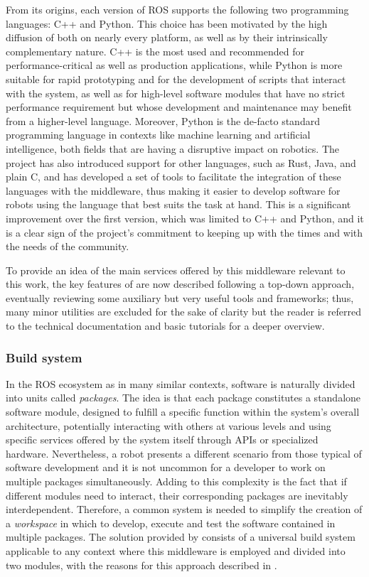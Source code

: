 From its origins, each version of ROS supports the following two programming languages: C++ and Python. This choice has been motivated by the high diffusion of both on nearly every platform, as well as by their intrinsically complementary nature. C++ is the most used and recommended for performance-critical as well as production applications, while Python is more suitable for rapid prototyping and for the development of scripts that interact with the system, as well as for high-level software modules that have no strict performance requirement but whose development and maintenance may benefit from a higher-level language. Moreover, Python is the de-facto standard programming language in contexts like machine learning and artificial intelligence, both fields that are having a disruptive impact on robotics. The \ROS project has also introduced support for other languages, such as Rust, Java, and plain C, and has developed a set of tools to facilitate the integration of these languages with the middleware, thus making it easier to develop software for robots using the language that best suits the task at hand. This is a significant improvement over the first version, which was limited to C++ and Python, and it is a clear sign of the project's commitment to keeping up with the times and with the needs of the community.

To provide an idea of the main services offered by this middleware relevant to this work, the key features of \ROS are now described following a top-down approach, eventually reviewing some auxiliary but very useful tools and frameworks; thus, many minor utilities are excluded for the sake of clarity but the reader is referred to the technical documentation \cite{open_robotics_ros_nodate} and basic tutorials \cite{open_robotics_tutorials_nodate} for a deeper overview.

\subsubsection{Build system}
\label{sec:ros2_buildsys}
In the ROS ecosystem as in many similar contexts, software is naturally divided into units called \emph{packages}. The idea is that each package constitutes a standalone software module, designed to fulfill a specific function within the system's overall architecture, potentially interacting with others at various levels and using specific services offered by the system itself through APIs or specialized hardware. Nevertheless, a robot presents a different scenario from those typical of software development and it is not uncommon for a developer to work on multiple packages simultaneously. Adding to this complexity is the fact that if different modules need to interact, their corresponding packages are inevitably interdependent. Therefore, a common system is needed to simplify the creation of a \emph{workspace} in which to develop, execute and test the software contained in multiple packages. The solution provided by \ROS consists of a universal build system applicable to any context where this middleware is employed and divided into two modules, with the reasons for this approach described in \cite{thomas_universal_2017}.

